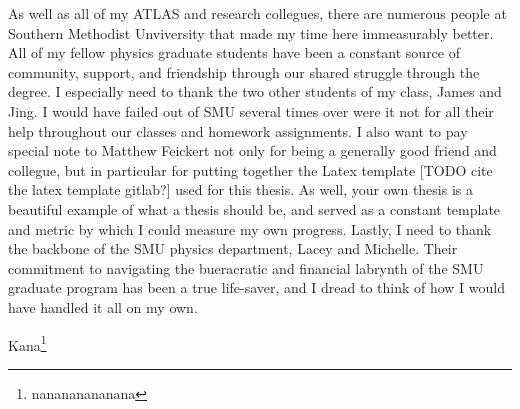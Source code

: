 As well as all of my ATLAS and research collegues,
    there are numerous people at Southern Methodist Unviversity that made my time here immeasurably better.
All of my fellow physics graduate students have been a constant source of community, support, and friendship
    through our shared struggle through the degree.
I especially need to thank the two other students of my class, James and Jing.
I would have failed out of SMU several times over were it not
    for all their help throughout our classes and homework assignments.
I also want to pay special note to Matthew Feickert not only for being a generally good friend and collegue,
    but in particular for putting together the Latex template [TODO cite the latex template gitlab?]
    used for this thesis.
As well, your own thesis\cite{matthew_feickert} is a beautiful example of what a thesis should be,
    and served as a constant template and metric by which I could measure my own progress.
Lastly, I need to thank the backbone of the SMU physics department, 
    Lacey and Michelle.
Their commitment to navigating the bueracratic and financial labrynth of the SMU graduate program
    has been a true life-saver, and I dread to think of how I would have handled it all on my own.










Kana\footnote{nanananananana}
